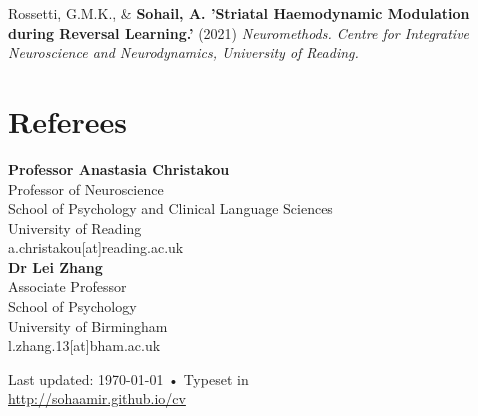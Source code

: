 \documentclass[10pt, a4paper]{article}
\begin{document}
Rossetti, G.M.K., \& \textbf{Sohail, A. 'Striatal Haemodynamic Modulation during Reversal Learning.'} (2021)
\textit{Neuromethods. Centre for Integrative Neuroscience and Neurodynamics, University of Reading.} \\


\section*{Referees}
\textbf{Professor Anastasia Christakou} \\
Professor of Neuroscience \\
School of Psychology and Clinical Language Sciences \\
University of Reading \\
a.christakou[at]reading.ac.uk \\

\textbf{Dr Lei Zhang} \\
Associate Professor \\
School of Psychology \\
University of Birmingham \\
l.zhang.13[at]bham.ac.uk


\vfill{}

\begin{center}
{\scriptsize  Last updated: \today\- •\- 
Typeset in \href{http://nitens.org/taraborelli/cvtex}{
\XeTeX }\\
\href{http://sohaamir.github.io/cv}{http://sohaamir.github.io/cv}}
\end{center}
\end{document}
